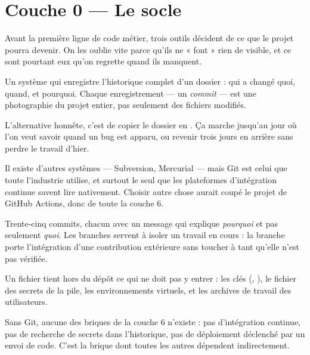 \chapter{Couche 0 — Le socle}

Avant la première ligne de code métier, trois outils décident de ce que le
projet pourra devenir. On les oublie vite parce qu'ils ne « font » rien de
visible, et ce sont pourtant eux qu'on regrette quand ils manquent.


\quoi
Un système qui enregistre l'historique complet d'un dossier : qui a changé
quoi, quand, et pourquoi. Chaque enregistrement --- un \emph{commit} --- est
une photographie du projet entier, pas seulement des fichiers modifiés.

\pourquoi
L'alternative honnête, c'est de copier le dossier en
. Ça marche jusqu'au jour où l'on veut savoir
quand un bug est apparu, ou revenir trois jours en arrière sans perdre le
travail d'hier.

Il existe d'autres systèmes --- Subversion, Mercurial --- mais Git est celui que
toute l'industrie utilise, et surtout le seul que les plateformes
d'intégration continue savent lire nativement. Choisir autre chose aurait coupé
le projet de GitHub Actions, donc de toute la couche 6.

\role
Trente-cinq commits, chacun avec un message qui explique \emph{pourquoi} et pas
seulement \emph{quoi}. Les branches servent à isoler un travail en cours : la
branche  porte l'intégration d'une contribution
extérieure sans toucher à  tant qu'elle n'est pas vérifiée.

Un fichier  tient hors du dépôt ce qui ne doit pas y
entrer : les clés (, ), le fichier
 des secrets de la pile, les environnements virtuels, et les archives
de travail des utilisateurs.

\apport
Sans Git, aucune des briques de la couche 6 n'existe : pas d'intégration
continue, pas de recherche de secrets dans l'historique, pas de déploiement
déclenché par un envoi de code. C'est la brique dont toutes les autres
dépendent indirectement.


